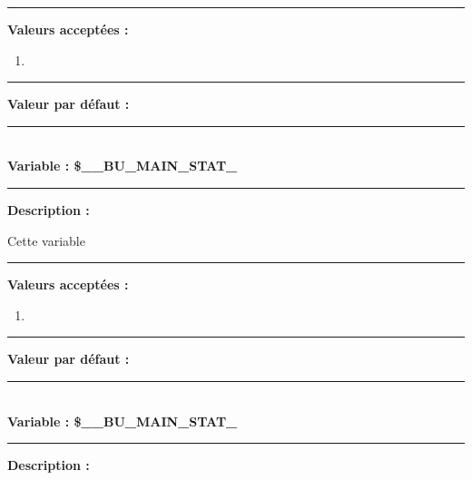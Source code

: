 \documentclass[a4paper,10pt]{article}
\begin{document}
\par\noindent\rule{\textwidth}{0.4pt}

\textbf{Valeurs acceptées :}
\begin{enumerate}
    \item 
\end{enumerate}

\par\noindent\rule{\textwidth}{0.4pt}

\textbf{Valeur par défaut :}



\color{vars}\par\noindent\rule{\textwidth}{0.4pt}\color{text}\\[1\baselineskip]

\textbf{Variable : \color{vars}\$\_\_BU\_MAIN\_STAT\_}\\[1\baselineskip]

\par\noindent\rule{\textwidth}{0.4pt}

\begin{justify}
    \textbf{Description :}
\end{justify}

\setlength{\parskip}{1em}

\begin{justify}
    Cette variable
\end{justify}

\par\noindent\rule{\textwidth}{0.4pt}

\textbf{Valeurs acceptées :}
\begin{enumerate}
    \item 
\end{enumerate}

\par\noindent\rule{\textwidth}{0.4pt}

\textbf{Valeur par défaut :}



\color{vars}\par\noindent\rule{\textwidth}{0.4pt}\color{text}\\[1\baselineskip]

\textbf{Variable : \color{vars}\$\_\_BU\_MAIN\_STAT\_}\\[1\baselineskip]

\par\noindent\rule{\textwidth}{0.4pt}

\begin{justify}
    \textbf{Description :}
\end{justify}
\end{document}
